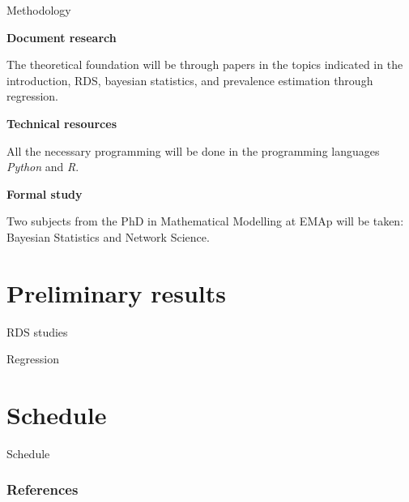 \documentclass{beamer}
\newcommand{\Space}{\vspace{3ex}}
\begin{document}
\begin{frame}{Methodology}

{\bf Document research}

The theoretical foundation will be through papers in the topics indicated in
the introduction, RDS, bayesian statistics, and prevalence estimation through
regression. 

\Space

{\bf Technical resources}

All the necessary programming will be done in the programming languages
\textit{Python} and \textit{R}. 

\Space

{\bf Formal study}

Two subjects from the PhD in Mathematical Modelling at EMAp will be taken:
Bayesian Statistics and Network Science.

\end{frame}


\section{Preliminary results}


\begin{frame}{RDS studies}
  
\end{frame}

\begin{frame}{Regression}
  
\end{frame}


\section{Schedule}

\begin{frame}{Schedule}
  
\end{frame}


\begin{frame}[t, allowframebreaks]
   \frametitle{References}
   
   
 \end{frame}
\end{document}

